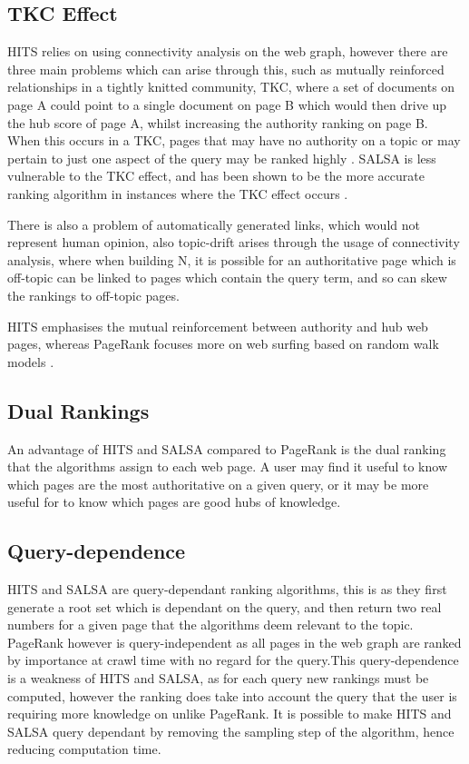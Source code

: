 \documentclass[11pt]{report}
\begin{document}
\subsection*{TKC Effect}

HITS relies on using connectivity analysis on the web graph, however there are three main problems which can arise through this, such as mutually reinforced relationships in a tightly knitted community, TKC, where a set of documents on page A could point to a single document on page B which would then drive up the hub score of page A, whilst increasing the authority ranking on page B. When this occurs in a TKC, pages that may have no authority on a topic or may pertain to just one aspect of the query may be ranked highly \cite{lempel2000stochastic}. SALSA is less vulnerable to the TKC effect, and has been shown to be the more accurate ranking algorithm in instances where the TKC effect occurs \cite{lempel2000stochastic}.

There is also a problem of automatically generated links, which would not represent human opinion, also topic-drift arises through the usage of connectivity analysis, where when building N, it is possible for an authoritative page which is off-topic can be linked to pages which contain the query term, and so can skew the rankings to off-topic pages.  

HITS emphasises the mutual reinforcement between authority and hub web pages, whereas PageRank focuses more on web surfing based on random walk models \cite{ding2003pagerank}.


\subsection*{Dual Rankings}
An advantage of HITS and SALSA compared to PageRank is the dual ranking that the algorithms assign to each web page. A user may find it useful to know which pages are the most authoritative on a given query, or it may be more useful for to know which pages are good hubs of knowledge.

\subsection*{Query-dependence}
HITS and SALSA are query-dependant ranking algorithms, this is as they first generate a root set which is dependant on the query, and then return two real numbers for a given page that the algorithms deem relevant to the topic. PageRank however is query-independent as all pages in the web graph are ranked by importance at crawl time with no regard for the query.This query-dependence is a weakness of HITS and SALSA, as for each query new rankings must be computed, however the ranking does take into account the query that the user is requiring more knowledge on unlike PageRank. It is possible to make HITS and SALSA query dependant by removing the sampling step of the algorithm, hence reducing computation time. 
\end{document}
